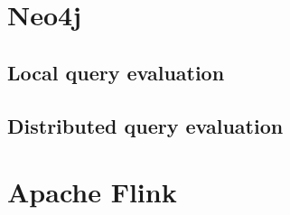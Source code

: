 \section{Neo4j}\label{sec:neo4j}
\subsection{Local query evaluation}
\subsection{Distributed query evaluation}
\section{Apache Flink}\label{sec:flink}
